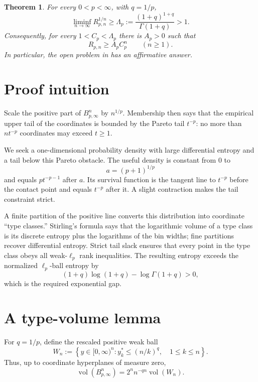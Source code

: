 \documentclass[11pt]{article}
\newtheorem{theorem}{Theorem}
\newcommand{\vol}{\operatorname{vol}}
\newcommand{\1}{\mathbf 1}
\begin{document}
\begin{theorem}\label{thm:main}
For every \(0<p<\infty\), with \(q=1/p\),
\[
 \liminf_{n\to\infty}R_{p,n}^{1/n}
 \geq
 \Lambda_p:=
 \frac{(1+q)^{1+q}}{\Gamma(1+q)}
 >1.
\]
Consequently, for every \(1<C_p<\Lambda_p\) there is \(A_p>0\) such
that
\[
 R_{p,n}\geq A_p C_p^n\qquad(n\geq1).
\]
In particular, the open problem in \cite{DV} has an affirmative answer.
\end{theorem}

\section{Proof intuition}

Scale the positive part of \(B_{p,\infty}^n\) by \(n^{1/p}\).  Membership
then says that the empirical upper tail of the coordinates is bounded by
the Pareto tail \(t^{-p}\): no more than \(nt^{-p}\) coordinates may
exceed \(t\geq1\).

We seek a one-dimensional probability density with large differential
entropy and a tail below this Pareto obstacle.  The useful density is
constant from \(0\) to
\[
 a=(p+1)^{1/p}
\]
and equals \(p t^{-p-1}\) after \(a\).  Its survival function is the
tangent line to \(t^{-p}\) before the contact point and equals \(t^{-p}\)
after it.  A slight contraction makes the tail constraint strict.

A finite partition of the positive line converts this distribution into
coordinate ``type classes.''  Stirling's formula says that the logarithmic
volume of a type class is its discrete entropy plus the logarithms of the
bin widths; fine partitions recover differential entropy.  Strict tail
slack ensures that every point in the type class obeys all weak-\(\ell_p\)
rank inequalities.  The resulting entropy exceeds the normalized
\(\ell_p\)-ball entropy by
\[
 (1+q)\log(1+q)-\log\Gamma(1+q)>0,
\]
which is the required exponential gap.

\section{A type-volume lemma}

For \(q=1/p\), define the rescaled positive weak ball
\[
 W_n:=\left\{y\in[0,\infty)^n:
 y_k^*\leq (n/k)^q,\quad 1\leq k\leq n\right\}.
\]
Thus, up to coordinate hyperplanes of measure zero,
\begin{equation}\label{eq:scale}
 \vol(B_{p,\infty}^n)=2^n n^{-qn}\vol(W_n).
\end{equation}
\end{document}

